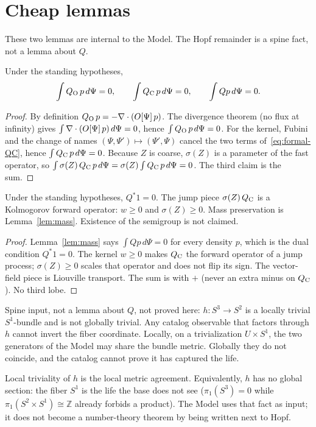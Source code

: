 \section{Cheap lemmas}
\label{sec:lemmas}

These two lemmas are internal to the Model.
The Hopf remainder is a spine fact, not a lemma about \(Q\).

\begin{lem}[Mass]
\label{lem:mass}
Under the standing hypotheses,
\[
\int Q_{\mathrm{O}}\,p\,d\Psi = 0,
\qquad
\int Q_{\mathrm{C}}\,p\,d\Psi = 0,
\qquad
\int Qp\,d\Psi = 0.
\]
\end{lem}

\begin{proof}
By definition \(Q_{\mathrm{O}}\,p=-\nabla\cdot(O[\Psi]\,p)\).
The divergence theorem (no flux at infinity) gives
\(\int\nabla\cdot(O[\Psi]\,p)\,d\Psi=0\), hence \(\int Q_{\mathrm{O}}\,p\,d\Psi=0\).
For the kernel, Fubini and the change of names \((\Psi,\Psi')\mapsto(\Psi',\Psi)\)
cancel the two terms of~\eqref{eq:formal-QC}, hence \(\int Q_{\mathrm{C}}\,p\,d\Psi=0\).
Because \(Z\) is coarse, \(\sigma(Z)\) is a parameter of the fast operator, so
\(\int\sigma(Z)\,Q_{\mathrm{C}}\,p\,d\Psi=\sigma(Z)\int Q_{\mathrm{C}}\,p\,d\Psi=0\).
The third claim is the sum.
\end{proof}

\begin{lem}[Markov]
\label{lem:markov}
Under the standing hypotheses, \(Q^{\ast}1=0\).
The jump piece \(\sigma(Z)\,Q_{\mathrm{C}}\) is a Kolmogorov forward operator:
\(w\ge 0\) and \(\sigma(Z)\ge 0\).
Mass preservation is Lemma~\ref{lem:mass}.
Existence of the semigroup is not claimed.
\end{lem}

\begin{proof}
Lemma~\ref{lem:mass} says \(\int Qp\,d\Psi=0\) for every density \(p\),
which is the dual condition \(Q^{\ast}1=0\).
The kernel \(w\ge 0\) makes \(Q_{\mathrm{C}}\) the forward operator of a jump process;
\(\sigma(Z)\ge 0\) scales that operator and does not flip its sign.
The vector-field piece is Liouville transport.
The sum is with \(+\) (never an extra minus on \(Q_{\mathrm{C}}\)).
No third lobe.
\end{proof}

\begin{spinefact}
\label{sf:hopf}
Spine input, not a lemma about \(Q\), not proved here:
\(h:S^{3}\to S^{2}\) is a locally trivial \(S^{1}\)-bundle and is not
globally trivial.
Any catalog observable that factors through \(h\) cannot invert the fiber
coordinate.
Locally, on a trivialization \(U\times S^{1}\), the two generators of the
Model may share the bundle metric.
Globally they do not coincide, and the catalog cannot prove it has captured
the life.
\end{spinefact}

Local triviality of \(h\) is the local metric agreement.
Equivalently, \(h\) has no global section:
the fiber \(S^{1}\) is the life the base does not see
(\(\pi_{1}(S^{3})=0\) while \(\pi_{1}(S^{2}\times S^{1})\cong\mathbb{Z}\)
already forbids a product).
The Model uses that fact as input; it does not become a number-theory theorem
by being written next to Hopf.

